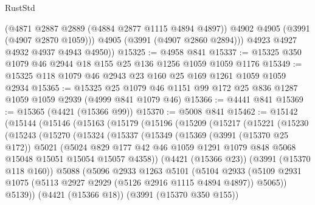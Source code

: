\begin{lexlean}{RustStd}
\begin{coremodule}
            (@4871 @2887 @2889 (@4884 @2877 @1115 @4894 @4897))
            @4902
            @4905
            (@3991 (@4907 @2870 @1059)))
          @4905
          (@3991 (@4907 @2860 @2894)))
        @4923
        @4927
        @4932
        @4937
        @4943
        @4950))
@15325 := @4958 @841
@15337 := @15325 @350 @1079 @46 @2944 @18 @155 @25 @136 @1256 @1059 @1059 @1176
@15349 := @15325 @118 @1079 @46 @2943 @23 @160 @25 @169 @1261 @1059 @1059 @2934
@15365 := @15325
    @25
    @1079
    @46
    @1151
    @99
    @172
    @25
    @836
    @1287
    @1059
    @1059
    @2939
    (@4999 @841 @1079 @46)
@15366 := @4441 @841
@15369 := @15365 (@4421 (@15366 @99))
@15370 := @5008 @841
@15462 := @15142
    (@15144
      (@15146
        (@15163
          (@15179
            (@15196
              (@15209
                (@15217
                  (@15221
                    (@15230
                      (@15243
                        (@15270
                          (@15324
                            (@15337
                              (@15349
                                (@15369
                                  (@3991 (@15370 @25 @172))
                                  @5021
                                  (@5024
                                    @829
                                    @177
                                    @42
                                    @46
                                    @1059
                                    @1291
                                    @1079
                                    @848
                                    @5068
                                    @15048
                                    @15051
                                    @15054
                                    @15057
                                    @4358))
                                (@4421 (@15366 @23))
                                (@3991 (@15370 @118 @160))
                                @5088
                                (@5096
                                  @2933
                                  @1263
                                  @5101
                                  (@5104
                                    @2933
                                    (@5109
                                      @2931
                                      @1075
                                      (@5113 @2927 @2929 (@5126 @2916 @1115 @4894 @4897))
                                      @5065))
                                  @5139))
                              (@4421 (@15366 @18))
                              (@3991 (@15370 @350 @155))

\end{coremodule}
\end{lexlean}

